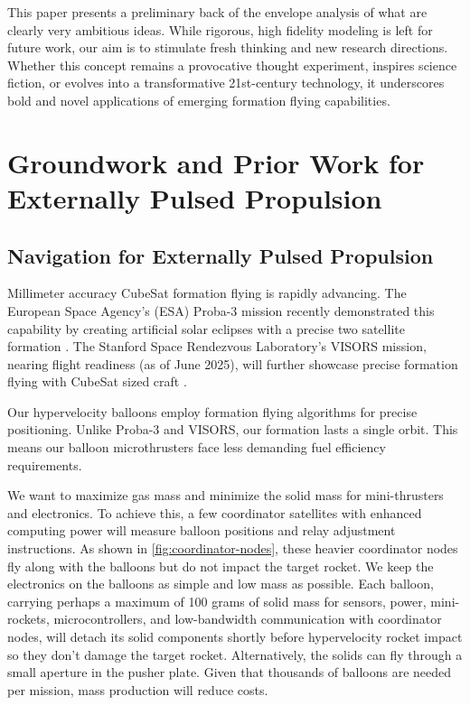 \documentclass{article}
\begin{document}
This paper presents a preliminary back of the envelope analysis of what are clearly very ambitious ideas. While rigorous, high fidelity modeling is left for future work, our aim is to stimulate fresh thinking and new research directions. Whether this concept remains a provocative thought experiment, inspires science fiction, or evolves into a transformative 21st-century technology, it underscores bold and novel applications of emerging formation flying capabilities. 

\section{Groundwork and Prior Work for Externally Pulsed Propulsion}
\subsection{Navigation for Externally Pulsed Propulsion}
Millimeter accuracy CubeSat formation flying is rapidly advancing. The European Space Agency's (ESA) Proba-3 mission recently demonstrated this capability by creating artificial solar eclipses with a precise two satellite formation \cite{esa_proba_3}. The Stanford Space Rendezvous Laboratory's VISORS mission, nearing flight readiness (as of June 2025), will further showcase precise formation flying with CubeSat sized craft \cite{guffanti2023autonomous}.  

Our hypervelocity balloons employ formation flying algorithms for precise positioning.  Unlike Proba-3 and VISORS, our formation lasts a single orbit. This means our balloon microthrusters face less demanding fuel efficiency requirements.

We want to maximize gas mass and minimize the solid mass for mini-thrusters and electronics. To achieve this, a few coordinator satellites with enhanced computing power will measure balloon positions and relay adjustment instructions.  As shown in \autoref{fig:coordinator-nodes}, these heavier coordinator nodes fly along with the balloons but do not impact the target rocket.  We keep the electronics on the balloons as simple and low mass as possible.   Each balloon, carrying perhaps a maximum of 100 grams of solid mass for sensors, power, mini-rockets, microcontrollers, and low-bandwidth communication with coordinator nodes, will detach its solid components shortly before hypervelocity rocket impact so they don't damage the target rocket.    Alternatively, the solids can fly through a small aperture in the pusher plate. Given that thousands of balloons are needed per mission, mass production will reduce costs.    
\end{document}
